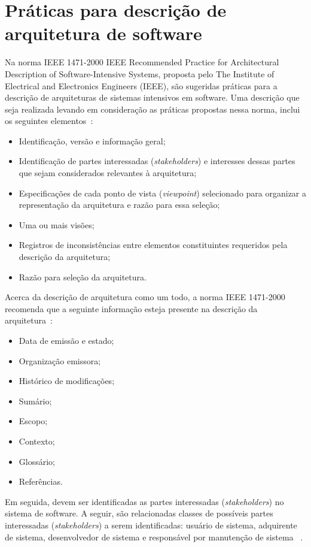 \section{Práticas para descrição de arquitetura de software}

Na norma IEEE 1471-2000 IEEE Recommended Practice for Architectural Description of Software-Intensive Systems, proposta pelo The Institute of Electrical and Electronics Engineers (IEEE), são sugeridas práticas para a descrição de arquiteturas de sistemas intensivos em software. Uma descrição que seja realizada levando em consideração as práticas propostas nessa norma, inclui os seguintes elementos~\cite{ISO_1471}:

\begin{itemize}
    \item Identificação, versão e informação geral;
    \item Identificação de partes interessadas (\emph{stakeholders}) e interesses dessas partes que sejam considerados relevantes à arquitetura;
    \item Especificações de cada ponto de vista (\emph{viewpoint}) selecionado para organizar a representação da arquitetura e razão para essa seleção;
    \item Uma ou mais visões;
    \item Registros de inconsistências entre elementos  constituintes requeridos pela descrição da arquitetura;
    \item Razão para seleção da arquitetura.
\end{itemize}

Acerca da descrição de arquitetura como um todo, a norma IEEE 1471-2000 recomenda que a seguinte informação esteja presente na descrição da arquitetura~\cite{ISO_1471}:

\begin{itemize}
    \item Data de emissão e estado;
    \item Organização emissora;
    \item Histórico de modificações;
    \item Sumário;
    \item Escopo;
    \item Contexto;
    \item Glossário;
    \item Referências.
\end{itemize}

Em seguida, devem ser identificadas as partes interessadas (\emph{stakeholders}) no sistema de software. A seguir, são relacionadas classes de possíveis partes interessadas (\emph{stakeholders}) a serem identificadas: usuário de sistema, adquirente de sistema, desenvolvedor de sistema e responsável por manutenção de sistema ~\cite{ISO_1471}.

